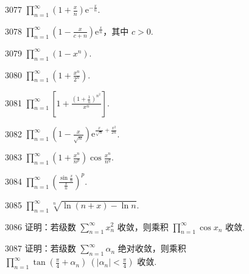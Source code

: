 \begin{prob}[S]{3077}
$\displaystyle \prod_{n=1}^{\infty} \left(1 + \frac{x}{n}\right) \mathrm{e}^{-\frac{x}{n}}$.
\end{prob}

\begin{prob}[M]{3078}
$\displaystyle \prod_{n=1}^{\infty} \left(1 - \frac{x}{c+n}\right) \mathrm{e}^{\frac{x}{n}}$，其中 $c > 0$.
\end{prob}

\begin{prob}[S]{3079}
$\displaystyle \prod_{n=1}^{\infty} (1 - x^{n})$.
\end{prob}

\begin{prob}[S]{3080}
$\displaystyle \prod_{n=1}^{\infty} \left(1 + \frac{x^{n}}{2^{n}}\right)$.
\end{prob}

\begin{prob}[S]{3081}
$\displaystyle \prod_{n=1}^{\infty} \left[1 + \frac{\left(1 + \frac{1}{n}\right)^{n^{2}}}{x^{n}}\right]$.
\end{prob}

\begin{prob}[S]{3082}
$\displaystyle \prod_{n=1}^{\infty} \left(1 - \frac{x}{\sqrt{n}}\right) \mathrm{e}^{\frac{x}{\sqrt{n}} + \frac{x^{2}}{2n}}$.
\end{prob}

\begin{prob}[S]{3083}
$\displaystyle \prod_{n=1}^{\infty} \left(1 + \frac{x^{n}}{n^{p}}\right) \cos \frac{x^{n}}{n^{q}}$.
\end{prob}

\begin{prob}[S]{3084}
$\displaystyle \prod_{n=1}^{\infty} \left(\frac{\sin \frac{x}{n}}{\frac{x}{n}}\right)^{p}$.
\end{prob}

\begin{prob}[S]{3085}
$\displaystyle \prod_{n=1}^{\infty} \sqrt[n]{\ln(n+x) - \ln n}$.
\end{prob}

\begin{prob}[M]{3086}
证明：若级数 $\displaystyle \sum_{n=1}^{\infty} x_{n}^{2}$ 收敛，则乘积 $\displaystyle \prod_{n=1}^{\infty} \cos x_{n}$ 收敛.
\end{prob}

\begin{prob}[M]{3087}
证明：若级数 $\displaystyle \sum_{n=1}^{\infty} \alpha_{n}$ 绝对收敛，则乘积 $\displaystyle \prod_{n=1}^{\infty} \tan\left(\frac{\pi}{4} + \alpha_{n}\right) \ \left(|\alpha_{n}| < \frac{\pi}{4}\right)$ 收敛.
\end{prob}

